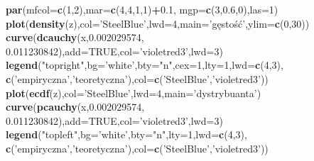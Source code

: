 \documentclass[polish,]{book}
\newenvironment{Shaded}{\begin{snugshade}}{\end{snugshade}}
\newcommand{\DataTypeTok}[1]{\textcolor[rgb]{0.13,0.29,0.53}{#1}}
\newcommand{\DecValTok}[1]{\textcolor[rgb]{0.00,0.00,0.81}{#1}}
\newcommand{\FloatTok}[1]{\textcolor[rgb]{0.00,0.00,0.81}{#1}}
\newcommand{\KeywordTok}[1]{\textcolor[rgb]{0.13,0.29,0.53}{\textbf{#1}}}
\newcommand{\NormalTok}[1]{#1}
\newcommand{\OperatorTok}[1]{\textcolor[rgb]{0.81,0.36,0.00}{\textbf{#1}}}
\newcommand{\OtherTok}[1]{\textcolor[rgb]{0.56,0.35,0.01}{#1}}
\newcommand{\StringTok}[1]{\textcolor[rgb]{0.31,0.60,0.02}{#1}}
\begin{document}
\begin{Shaded}
\begin{Highlighting}[]
\KeywordTok{par}\NormalTok{(}\DataTypeTok{mfcol=}\KeywordTok{c}\NormalTok{(}\DecValTok{1}\NormalTok{,}\DecValTok{2}\NormalTok{),}\DataTypeTok{mar=}\KeywordTok{c}\NormalTok{(}\DecValTok{4}\NormalTok{,}\DecValTok{4}\NormalTok{,}\DecValTok{1}\NormalTok{,}\DecValTok{1}\NormalTok{)}\OperatorTok{+}\FloatTok{0.1}\NormalTok{, }\DataTypeTok{mgp=}\KeywordTok{c}\NormalTok{(}\DecValTok{3}\NormalTok{,}\FloatTok{0.6}\NormalTok{,}\DecValTok{0}\NormalTok{),}\DataTypeTok{las=}\DecValTok{1}\NormalTok{)}
\KeywordTok{plot}\NormalTok{(}\KeywordTok{density}\NormalTok{(z),}\DataTypeTok{col=}\StringTok{'SteelBlue'}\NormalTok{,}\DataTypeTok{lwd=}\DecValTok{4}\NormalTok{,}\DataTypeTok{main=}\StringTok{'gęstość'}\NormalTok{,}\DataTypeTok{ylim=}\KeywordTok{c}\NormalTok{(}\DecValTok{0}\NormalTok{,}\DecValTok{30}\NormalTok{))}
\KeywordTok{curve}\NormalTok{(}\KeywordTok{dcauchy}\NormalTok{(x,}\FloatTok{0.002029574}\NormalTok{, }\FloatTok{0.011230842}\NormalTok{),}\DataTypeTok{add=}\OtherTok{TRUE}\NormalTok{,}\DataTypeTok{col=}\StringTok{'violetred3'}\NormalTok{,}\DataTypeTok{lwd=}\DecValTok{3}\NormalTok{)}
\KeywordTok{legend}\NormalTok{(}\StringTok{"topright"}\NormalTok{,}\DataTypeTok{bg=}\StringTok{'white'}\NormalTok{,}\DataTypeTok{bty=}\StringTok{"n"}\NormalTok{,}\DataTypeTok{cex=}\DecValTok{1}\NormalTok{,}\DataTypeTok{lty=}\DecValTok{1}\NormalTok{,}\DataTypeTok{lwd=}\KeywordTok{c}\NormalTok{(}\DecValTok{4}\NormalTok{,}\DecValTok{3}\NormalTok{),}
       \KeywordTok{c}\NormalTok{(}\StringTok{'empiryczna'}\NormalTok{,}\StringTok{'teoretyczna'}\NormalTok{),}\DataTypeTok{col=}\KeywordTok{c}\NormalTok{(}\StringTok{'SteelBlue'}\NormalTok{,}\StringTok{'violetred3'}\NormalTok{))}
\KeywordTok{plot}\NormalTok{(}\KeywordTok{ecdf}\NormalTok{(z),}\DataTypeTok{col=}\StringTok{'SteelBlue'}\NormalTok{,}\DataTypeTok{lwd=}\DecValTok{4}\NormalTok{,}\DataTypeTok{main=}\StringTok{'dystrybuanta'}\NormalTok{)}
\KeywordTok{curve}\NormalTok{(}\KeywordTok{pcauchy}\NormalTok{(x,}\FloatTok{0.002029574}\NormalTok{, }\FloatTok{0.011230842}\NormalTok{),}\DataTypeTok{add=}\OtherTok{TRUE}\NormalTok{,}\DataTypeTok{col=}\StringTok{'violetred3'}\NormalTok{,}\DataTypeTok{lwd=}\DecValTok{3}\NormalTok{)}
\KeywordTok{legend}\NormalTok{(}\StringTok{"topleft"}\NormalTok{,}\DataTypeTok{bg=}\StringTok{'white'}\NormalTok{,}\DataTypeTok{bty=}\StringTok{"n"}\NormalTok{,}\DataTypeTok{lty=}\DecValTok{1}\NormalTok{,}\DataTypeTok{lwd=}\KeywordTok{c}\NormalTok{(}\DecValTok{4}\NormalTok{,}\DecValTok{3}\NormalTok{),}
       \KeywordTok{c}\NormalTok{(}\StringTok{'empiryczna'}\NormalTok{,}\StringTok{'teoretyczna'}\NormalTok{),}\DataTypeTok{col=}\KeywordTok{c}\NormalTok{(}\StringTok{'SteelBlue'}\NormalTok{,}\StringTok{'violetred3'}\NormalTok{))}
\end{Highlighting}
\end{Shaded}
\end{document}
